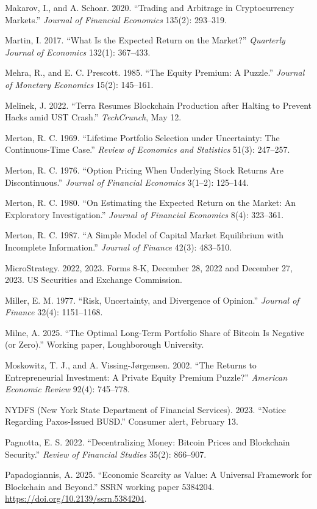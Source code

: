\documentclass[11pt]{article}
\begin{document}
\begin{list}{}{\setlength{\itemindent}{-1.5em}\setlength{\leftmargin}{1.5em}\setlength{\itemsep}{2pt}\setlength{\parsep}{0pt}}
\item Makarov, I., and A. Schoar. 2020. ``Trading and Arbitrage in Cryptocurrency Markets.'' \emph{Journal of Financial Economics} 135(2): 293--319.
\item Martin, I. 2017. ``What Is the Expected Return on the Market?'' \emph{Quarterly Journal of Economics} 132(1): 367--433.
\item Mehra, R., and E. C. Prescott. 1985. ``The Equity Premium: A Puzzle.'' \emph{Journal of Monetary Economics} 15(2): 145--161.
\item Melinek, J. 2022. ``Terra Resumes Blockchain Production after Halting to Prevent Hacks amid UST Crash.'' \emph{TechCrunch}, May 12.
\item Merton, R. C. 1969. ``Lifetime Portfolio Selection under Uncertainty: The Continuous-Time Case.'' \emph{Review of Economics and Statistics} 51(3): 247--257.
\item Merton, R. C. 1976. ``Option Pricing When Underlying Stock Returns Are Discontinuous.'' \emph{Journal of Financial Economics} 3(1--2): 125--144.
\item Merton, R. C. 1980. ``On Estimating the Expected Return on the Market: An Exploratory Investigation.'' \emph{Journal of Financial Economics} 8(4): 323--361.
\item Merton, R. C. 1987. ``A Simple Model of Capital Market Equilibrium with Incomplete Information.'' \emph{Journal of Finance} 42(3): 483--510.
\item MicroStrategy. 2022, 2023. Forms 8-K, December 28, 2022 and December 27, 2023. US Securities and Exchange Commission.
\item Miller, E. M. 1977. ``Risk, Uncertainty, and Divergence of Opinion.'' \emph{Journal of Finance} 32(4): 1151--1168.
\item Milne, A. 2025. ``The Optimal Long-Term Portfolio Share of Bitcoin Is Negative (or Zero).'' Working paper, Loughborough University.
\item Moskowitz, T. J., and A. Vissing-J\o rgensen. 2002. ``The Returns to Entrepreneurial Investment: A Private Equity Premium Puzzle?'' \emph{American Economic Review} 92(4): 745--778.
\item NYDFS (New York State Department of Financial Services). 2023. ``Notice Regarding Paxos-Issued BUSD.'' Consumer alert, February 13.
\item Pagnotta, E. S. 2022. ``Decentralizing Money: Bitcoin Prices and Blockchain Security.'' \emph{Review of Financial Studies} 35(2): 866--907.
\item Papadogiannis, A. 2025. ``Economic Scarcity as Value: A Universal Framework for Blockchain and Beyond.'' SSRN working paper 5384204. \url{https://doi.org/10.2139/ssrn.5384204}.

\end{list}
\end{document}
